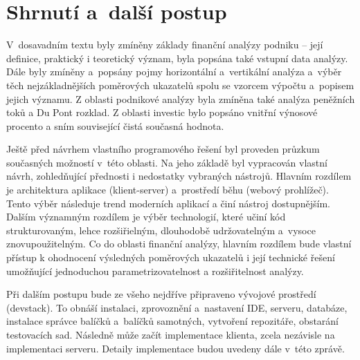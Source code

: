 \section{Shrnutí a~další postup}
V~dosavadním textu byly zmíněny základy finanční analýzy podniku -- její definice, praktický i teoretický význam, byla popsána také vstupní data analýzy. Dále byly zmíněny a~popsány pojmy horizontální a~vertikální analýza a~výběr těch nejzákladnějších poměrových ukazatelů spolu se vzorcem výpočtu a~popisem jejich významu. Z oblasti podnikové analýzy byla zmíněna také analýza peněžních toků a Du Pont rozklad. Z oblasti investic bylo popsáno vnitřní výnosové procento a sním související čistá současná hodnota.

Ještě před návrhem vlastního programového řešení byl proveden průzkum současných možností v~této oblasti. Na jeho základě byl vypracován vlastní návrh, zohledňující přednosti i nedostatky vybraných nástrojů. Hlavním rozdílem je architektura aplikace (klient-server) a~prostředí běhu (webový prohlížeč). Tento výběr následuje trend moderních aplikací a činí nástroj dostupnějším. Dalším významným rozdílem je výběr technologií, které učiní kód strukturovaným, lehce rozšiřielným, dlouhodobě udržovatelným a~vysoce znovupoužitelným. Co do oblasti finanční analýzy, hlavním rozdílem bude vlastní přístup k ohodnocení výsledných poměrových ukazatelů i její technické řešení umožňující jednoduchou parametrizovatelnost a rozšiřitelnost analýzy.

Při dalším postupu bude ze všeho nejdříve připraveno vývojové prostředí (devstack). To obnáší instalaci, zprovoznění a~nastavení IDE, serveru, databáze, instalace správce balíčků a~balíčků samotných, vytvoření repozitáře, obstarání testovacích sad. Následně může začít implementace klienta, zcela nezávisle na implementaci serveru. Detaily implementace budou uvedeny dále v~této zprávě.






















































